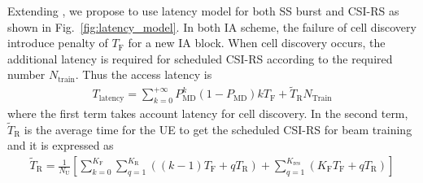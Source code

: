 \documentclass[journal]{IEEEtran}
\newcommand{\tx}[0]{\text{T}}
\newcommand{\rx}[0]{\text{R}}
\newcommand{\TSS}[0]{T_{\text{F}}}
\newcommand{\NUE}[0]{N_{\text{U}}}
\begin{document}
Extending \cite{Giordani_beam_turotial_arxiv_1804}, we propose to use latency model for both SS burst and CSI-RS as shown in Fig.~\ref{fig:latency_model}. In both IA scheme, the failure of cell discovery introduce penalty of $\TSS$ for a new IA block. When cell discovery occurs, the additional latency is required for scheduled CSI-RS according to the required number $N_{\text{train}}$. Thus the access latency is  
\begin{align}
T_{\text{latency}} = \sum_{k=0}^{+\infty}P^{k}_{\text{MD}}(1-P_{\text{MD}})k\TSS + \tilde{T}_{\text{R}}N_{\text{Train}}
\label{eq:latency}
\end{align}
where the first term takes account latency for cell discovery. In the second term, $\tilde{T}_{\text{R}}$ is the average time for the UE to get the scheduled CSI-RS for beam training and it is expressed as
\begin{align*}
\tilde{T}_{\text{R}} = \frac{1}{\NUE}\left[\sum_{k=0}^{K_{\text{F}}}\sum_{q=1}^{K_{\text{R}}}((k-1)\TSS+qT_{\text{R}})+ \sum_{q=1}^{K_{\text{res}}}(K_{\text{F}}\TSS+qT_{\text{R}})\right]
\end{align*}
\end{document}
